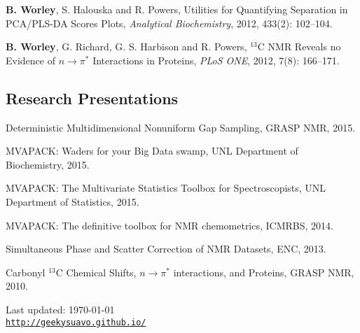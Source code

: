 \documentclass[letterpaper]{article}
\def\footerlink{http://geekysuavo.github.io/}
\renewenvironment{itemize}{
  \begin{list}{}{
    \setlength{\leftmargin}{1.5em}
  }
}{
  \end{list}
}
\begin{document}
\begin{itemize}
\item \textbf{B. Worley}, S. Halouska and R. Powers,
 Utilities for Quantifying Separation in PCA/PLS-DA Scores Plots,
 {\it Analytical Biochemistry},
 2012, 433(2): 102--104.
\end{itemize}

\begin{itemize}
\item \textbf{B. Worley}, G. Richard, G. S. Harbison and R. Powers,
 $^{13}$C NMR Reveals no Evidence of $n\rightarrow\pi^*$ Interactions
 in Proteins, {\it PLoS ONE},
 2012, 7(8): 166--171.
\end{itemize}

\subsection*{Research Presentations}

\begin{itemize}
\item Deterministic Multidimensional Nonuniform Gap Sampling,
  GRASP NMR, 2015.
\end{itemize}

\begin{itemize}
\item MVAPACK: Waders for your Big Data swamp,
  UNL Department of Biochemistry, 2015.
\end{itemize}

\begin{itemize}
\item MVAPACK: The Multivariate Statistics Toolbox for Spectroscopists,
  UNL Department of Statistics, 2015.
\end{itemize}

\begin{itemize}
\item MVAPACK: The definitive toolbox for NMR chemometrics, ICMRBS, 2014.
\end{itemize}

\begin{itemize}
\item Simultaneous Phase and Scatter Correction of NMR Datasets, ENC, 2013.
\end{itemize}

\begin{itemize}
\item Carbonyl $^{13}$C Chemical Shifts, $n\rightarrow\pi^*$ interactions,
  and Proteins, GRASP NMR, 2010.
\end{itemize}

\bigskip

\begin{center}
  \begin{footnotesize}
    Last updated: \today \\
    \href{\footerlink}{\texttt{\footerlink}}
  \end{footnotesize}
\end{center}

\end{document}
